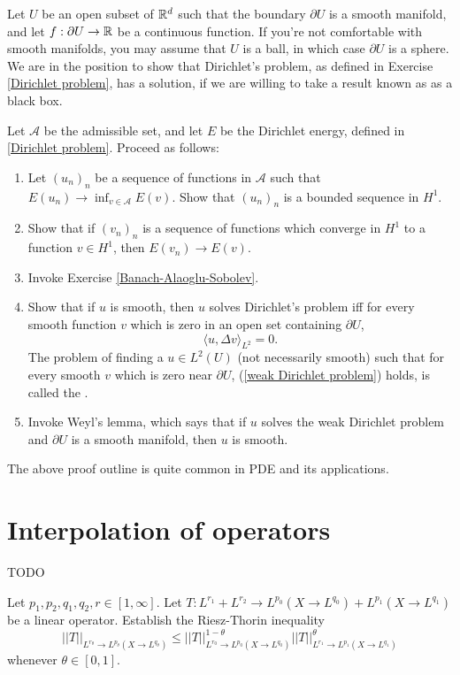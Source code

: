 \begin{exercise}
\label{Dirichlet problem 2}
Let $U$ be an open subset of $\mathbb{R}^d$ such that the boundary $\partial U$ is a smooth manifold, and let $f: \partial U \to \mathbb{R}$ be a continuous function.
If you're not comfortable with smooth manifolds, you may assume that $U$ is a ball, in which case $\partial U$ is a sphere.
We are in the position to show that Dirichlet's problem, as defined in Exercise \ref{Dirichlet problem}, has a solution, if we are willing to take a result known as  as a black box.

Let $\mathcal A$ be the admissible set, and let $E$ be the Dirichlet energy, defined in \ref{Dirichlet problem}.
Proceed as follows:
\begin{enumerate}
\item Let $(u_{n})_{n}$ be a sequence of functions in $\mathcal A$ such that $E(u_{n}) \to \inf_{v \in \mathcal A} E(v)$.
Show that $(u_{n})_{n}$ is a bounded sequence in $H^1$.
\item Show that if $(v_{n})_{n}$ is a sequence of functions which converge in $H^1$ to a function $v \in H^1$, then $E(v_{n}) \to E(v)$.
\item Invoke Exercise \ref{Banach-Alaoglu-Sobolev}.
\item Show that if $u$ is smooth, then $u$ solves Dirichlet's problem iff for every smooth function $v$ which is zero in an open set containing $\partial U$,
\begin{equation}
\label{weak Dirichlet problem}
\langle u, \Delta v\rangle_{L^2} = 0.
\end{equation}
The problem of finding a $u \in L^2(U)$ (not necessarily smooth) such that for every smooth $v$ which is zero near $\partial U$, (\ref{weak Dirichlet problem}) holds, is called the .
\item Invoke Weyl's lemma, which says that if $u$ solves the weak Dirichlet problem and $\partial U$ is a smooth manifold, then $u$ is smooth.
\end{enumerate}
The above proof outline is quite common in PDE and its applications.
\end{exercise}


\section{Interpolation of operators}
TODO

\begin{exercise}
Let $p_1,p_2,q_1,q_2,r \in [1, \infty]$. Let $T: L^{r_1} + L^{r_2} \to L^{p_0}(X \to L^{q_0}) + L^{p_1}(X \to L^{q_1})$ be a linear operator.
Establish the Riesz-Thorin inequality
\[||T||_{L^{r_\theta} \to L^{p_\theta}(X \to L^{q_\theta})} \leq ||T||_{L^{r_0} \to L^{p_0}(X \to L^{q_0})}^{1 - \theta} ||T||_{L^{r_1} \to L^{p_1}(X \to L^{q_1})}^\theta\]
whenever $\theta \in [0, 1]$.
\end{exercise}


